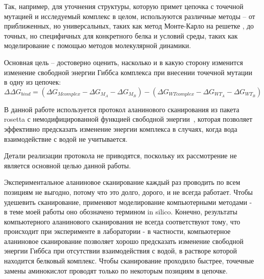 Так, например, для уточнения структуры, которую примет цепочка с точечной мутацией и исследуемый комплекс в целом, используются различные методы -- от приближенных, но универсальных, таких как метод Монте-Карло на решетке \cite{monte_carlo}, до точных, но специфичных для конкретного белка и условий среды, таких как моделирование с помощью методов молекулярной динамики.

Основная цель -- достоверно оценить, насколько и в какую сторону изменится изменение свободной энергии Гиббса \ddG комплекса при внесении точечной мутации в одну из цепочек:
$$
\Delta\Delta G_{bind} = (\Delta G_{M complex} - \Delta G_{M_A} - \Delta G_{M_B}) - (\Delta G_{WT complex} - \Delta G_{WT_A} - \Delta G_{WT_B})
$$

В данной работе используется протокол аланинового сканирования из пакета rosetta с немодифицированной функцией свободной энергии~\cite{kortemme2002}, которая позволяет эффективно предсказать изменение энергии комплекса в случаях, когда вода взаимодействие с водой не учитывается.

Детали реализации протокола не приводятся, поскольку их рассмотрение не является основной целью данной работы.

Экспериментальное аланиновое сканирование каждый раз проводить по всем позициям не выгодно, потому что это долго, дорого, и не всегда работает. Чтобы удешевить сканирование, применяют моделирование компьютерными методами - в теме моей работы оно обозначено термином in silico. Конечно, результаты компьютерного аланинового сканирования не всегда соответствуют тому, что происходит при эксперименте в лаборатории - в частности, компьютерное аланиновое сканирование позволяет хорошо предсказать изменение свободной энергии Гиббса при отсутствии взаимодействия с водой, в растворе которой находится белковый комплекс.
Чтобы сканирование проходило быстрее, точечные замены аминокислот проводят только по некоторым позициям в цепочке. 


